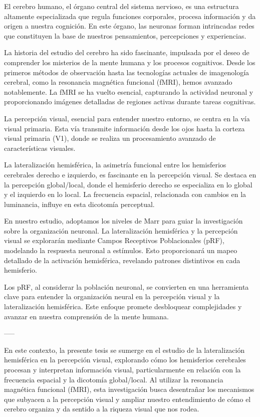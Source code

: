 \documentclass[12pt,oneside]{uhthesis}
\begin{document}
\newpage

El cerebro humano, el órgano central del sistema nervioso, es una estructura altamente especializada que regula funciones corporales, procesa información y da origen a nuestra cognición. En este órgano, las neuronas forman intrincadas redes que constituyen la base de nuestros pensamientos, percepciones y experiencias.

La historia del estudio del cerebro ha sido fascinante, impulsada por el deseo de comprender los misterios de la mente humana y los procesos cognitivos. Desde los primeros métodos de observación hasta las tecnologías actuales de imagenología cerebral, como la resonancia magnética funcional (fMRI), hemos avanzado notablemente. La fMRI se ha vuelto esencial, capturando la actividad neuronal y proporcionando imágenes detalladas de regiones activas durante tareas cognitivas.

La percepción visual, esencial para entender nuestro entorno, se centra en la vía visual primaria. Esta vía transmite información desde los ojos hasta la corteza visual primaria (V1), donde se realiza un procesamiento avanzado de características visuales.

La lateralización hemisférica, la asimetría funcional entre los hemisferios cerebrales derecho e izquierdo, es fascinante en la percepción visual. Se destaca en la percepción global/local, donde el hemisferio derecho se especializa en lo global y el izquierdo en lo local. La frecuencia espacial, relacionada con cambios en la luminancia, influye en esta dicotomía perceptual.

En nuestro estudio, adoptamos los niveles de Marr para guiar la investigación sobre la organización neuronal. La lateralización hemisférica y la percepción visual se explorarán mediante Campos Receptivos Poblacionales (pRF), modelando la respuesta neuronal a estímulos. Esto proporcionará un mapeo detallado de la activación hemisférica, revelando patrones distintivos en cada hemisferio.

Los pRF, al considerar la población neuronal, se convierten en una herramienta clave para entender la organización neural en la percepción visual y la lateralización hemisférica. Este enfoque promete desbloquear complejidades y avanzar en nuestra comprensión de la mente humana.

-----

En este contexto, la presente tesis se sumerge en el estudio de la lateralización hemisférica en la percepción visual, explorando cómo los hemisferios cerebrales procesan y interpretan información visual, particularmente en relación con la frecuencia espacial y la dicotomía global/local. Al utilizar la resonancia magnética funcional (fMRI), esta investigación busca desentrañar los mecanismos que subyacen a la percepción visual y ampliar nuestro entendimiento de cómo el cerebro organiza y da sentido a la riqueza visual que nos rodea.
\end{document}

